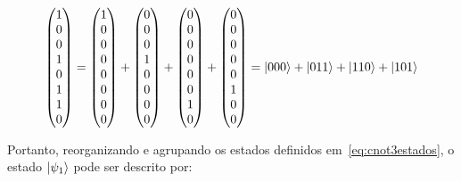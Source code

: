 \begin{equation}
	\begin{split}
	\begin{pmatrix}
	1 \\
	0 \\
	0 \\
	1 \\
	0 \\
	1 \\
	1 \\
	0
	\end{pmatrix} = \begin{pmatrix}
	1 \\
	0 \\
	0 \\
	0 \\
	0 \\
	0 \\
	0 \\
	0
	\end{pmatrix} + \begin{pmatrix}
	0 \\
	0 \\
	0 \\
	1 \\
	0 \\
	0 \\
	0 \\
	0
	\end{pmatrix} + \begin{pmatrix}
	0 \\
	0 \\
	0 \\
	0 \\
	0 \\
	0 \\
	1 \\
	0
	\end{pmatrix} + \begin{pmatrix}
	0 \\
	0 \\
	0 \\
	0 \\
	0 \\
	1 \\
	0 \\
	0
	\end{pmatrix} = \ket{000}+\ket{011}+\ket{110}+\ket{101}
	\end{split}
\end{equation}

 Portanto, reorganizando e agrupando os estados definidos em~\eqref{eq:cnot3estados}, o estado $\ket{\psi_1}$ pode ser descrito por:
 
